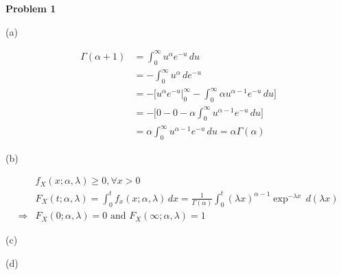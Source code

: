 \documentclass[letterpaper, 11pt]{article}
\newcommand{\1}{\mathds{1}}	%
\theoremstyle{definition}
\begin{document}
\textbf{Problem 1}

(a)

\begin{align*}
    \Gamma(\alpha+1) & = \int_{0}^{\infty } u^{\alpha} e^{-u} \, du                                                            \\
                     & = - \int_{0}^{\infty} u^{\alpha} \, de^{-u}                                                             \\
                     & = - \Big[u^{\alpha}e^{-u}\Big|_0^{\infty }- \int_{0}^{\infty } \alpha u^{\alpha - 1} e^{-u}  \, du\Big] \\
                     & = -\Big[ 0- 0- \alpha \int_{0}^{\infty } u^{\alpha-1}e^{-u} \, du \Big]                                 \\
                     & =  \alpha \int_{0}^{\infty } u^{\alpha-1}e^{-u} \, du = \alpha \Gamma(\alpha)
\end{align*}


(b)

\begin{align*}
                    & f_X(x;\alpha,\lambda) \geq  0, \forall x > 0                                                                                                                          \\
                    & F_X(t;\alpha,\lambda) = \int_{0}^{t} f_x(x;\alpha,\lambda) \, dx = \frac{1}{\Gamma(\alpha)} \int_{0}^{t} (\lambda x)^{\alpha - 1} \exp ^{-\lambda x}  \, d(\lambda x) \\
    \Longrightarrow & F_X(0;\alpha,\lambda) = 0 \text{ and }  F_X(\infty ;\alpha,\lambda) = 1
\end{align*}

(c)


(d)
\end{document}
